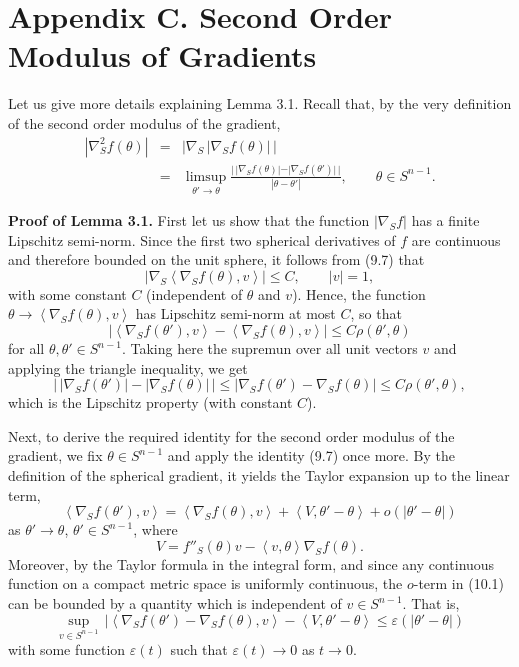 \documentclass[reqno,12pt]{amsart}
\theoremstyle{plain}
\begin{document}
\vskip10mm
\section{{\bf Appendix C. Second Order Modulus of Gradients}}
\setcounter{equation}{0}

\vskip2mm
\noindent
Let us give more details explaining Lemma 3.1. Recall that, by the very
definition of the second order modulus of the gradient,
\begin{eqnarray*}
|\nabla_S^2 f(\theta)|
 & = &
|\nabla_S \, |\nabla_S f(\theta)|\,| \\
 & = & 
\limsup_{\theta' \rightarrow \theta} 
\frac{|\,|\nabla_S f(\theta)|-|\nabla_S f(\theta')|\,|}{|\theta - \theta'|}, 
\qquad \theta \in S^{n-1}.
\end{eqnarray*}

\vskip2mm
{\bf Proof of Lemma 3.1.}
First let us show that the function $|\nabla_S f|$ has a finite Lipschitz 
semi-norm. Since the first two spherical derivatives of $f$ are continuous 
and therefore bounded on the unit sphere, it follows from (9.7) that
$$
|\nabla_S \left<\nabla_S f(\theta),v\right>| \leq C, \qquad |v|=1,
$$
with some constant $C$ (independent of $\theta$ and $v$).
Hence, the function $\theta \rightarrow \left<\nabla_S f(\theta),v\right>$
has Lipschitz semi-norm at most $C$, so that
$$
|\left<\nabla_S f(\theta'),v\right> - \left<\nabla_S f(\theta),v\right>| \leq 
C \rho(\theta',\theta)
$$
for all $\theta, \theta' \in S^{n-1}$. Taking here the supremun over all 
unit vectors $v$ and applying the triangle inequality, we get
$$
\Big|\,|\nabla_S f(\theta')| - |\nabla_S f(\theta)|\,\Big| \leq
|\nabla_S f(\theta') - \nabla_S f(\theta)| \leq 
C \rho(\theta',\theta),
$$
which is the Lipschitz property (with constant $C$).

Next, to derive the required identity for the second order modulus of the 
gradient, we fix $\theta \in S^{n-1}$ and apply the identity (9.7) once 
more. By the definition of the spherical gradient, it yields the Taylor 
expansion up to the linear term,
\begin{equation}
\left<\nabla_S f(\theta'),v\right> = \left<\nabla_S f(\theta),v\right> +
\left<V,\theta' - \theta\right> + o(|\theta' - \theta|)
\end{equation}
as $\theta' \rightarrow \theta$, $\theta' \in S^{n-1}$, where
$$
V = f''_S(\theta) v - \left<v,\theta\right> \nabla_S f(\theta).
$$
Moreover, by the Taylor formula in the integral form, and since any continuous
function on a compact metric space is uniformly continuous,
the $o$-term in (10.1) can be bounded by a quantity which is
independent of $v \in S^{n-1}$. That is,
$$
\sup_{v \in S^{n-1}} \,
|\left<\nabla_S f(\theta') - \nabla_S f(\theta),v\right> - 
\left<V,\theta' - \theta\right> \leq {\varepsilon}(|\theta' - \theta|)
$$
with some function ${\varepsilon}(t)$ such that ${\varepsilon}(t) \rightarrow 0$ as
$t \rightarrow 0$. 
\end{document}
